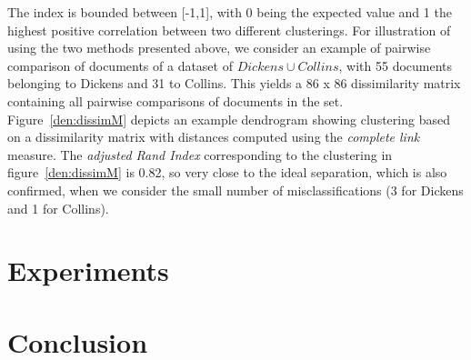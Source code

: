\documentclass[a4paper,10pt,twoside,fleqn]{article}
\begin{document}
The index is bounded between [-1,1], with 0 being the expected value and 1 the highest positive correlation between two different clusterings. 
For illustration of using the two methods presented above, we consider an example of pairwise comparison of documents 
of a dataset of  $Dickens\cup Collins$, with 55 documents belonging to Dickens and 31 to Collins. 
This yields a 86 x 86 dissimilarity matrix containing all pairwise comparisons of documents in the set.  
Figure~\ref{den:dissimM} depicts an example dendrogram showing clustering based on a dissimilarity matrix with distances computed using the  \emph{complete link} measure. 
The \emph{adjusted Rand Index} corresponding to the clustering in figure~\ref{den:dissimM} is 0.82, so very close to the ideal separation, which is also confirmed, when we consider the small number of
misclassifications (3 for Dickens and 1 for Collins).  

 


\section{Experiments}\label{sec:experiments}



\section{Conclusion}\label{sec:conclusion}









 
  

\end{document}
